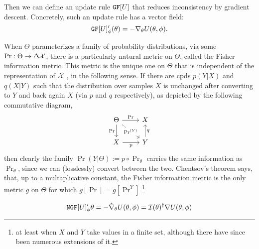 \documentclass{article}
\begin{document}
Then we can define an update rule $\mathtt{GF}[U]$ that reduces inconsistency by gradient descent. Concretely, such an update rule has a vector field:
\[
    \mathtt{GF}[U]'_\phi(\theta) = - \nabla_\theta U(\theta,\phi).
\]

When $\Theta$ parameterizes a family of probability distributions, via some $\Pr : \Theta \to \Delta \mathcal X$, there is a particularly natural metric on $\Theta$, called the Fisher information metric.
This metric is the unique one on $\Theta$ that is
independent of the representation of $\mathcal X$ \parencite{chentsov}, in the following sense.
If there are cpds $p(Y|X)$ and $q(X|Y)$ such that
the distribution over samples $X$ is unchanged after converting to $Y$ and back again $X$ (via $p$ and $q$ respectively), as depicted by the following commutative diagram,
\[
    \begin{tikzcd}
        \Theta \ar[r,"\Pr"]\ar[d,"\Pr"']
            \ar[rd,dashed,"\Pr^{(Y)}"description]& X \\
        X \ar[r,"p"'] & Y \ar[u, "q"']
    \end{tikzcd}
\]
then clearly the family $\Pr(Y|\Theta) := p\circ\Pr_{\theta}$ carries the same information as $\Pr_\theta$, since we can (losslessly) convert between the two.
Chentsov's theorem says, that, up to a multaplicative constant, the Fisher information metric is the only metric $g$ on $\Theta$ for which
$g[\Pr] = g[\Pr^{Y}]$
\footnote{at least when $X$ and $Y$ take values in a finite set, although there have since been numerous extensions of it.}


\[
    \mathtt{NGF}[U]'_\phi \theta = - \hat \nabla_\theta U(\theta,\phi)
        = \mathcal I(\theta)^{\dagger}  \nabla U(\theta, \phi)
\]
\end{document}
